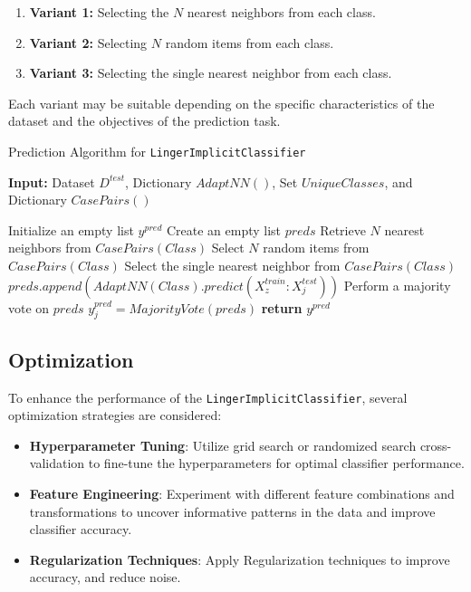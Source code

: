 \documentclass[a4paper, 12pt]{report}
\begin{document}
\begin{enumerate}
\item \textbf{Variant 1:} Selecting the $N$ nearest neighbors from each class.
\item \textbf{Variant 2:} Selecting $N$ random items from each class.
\item \textbf{Variant 3:} Selecting the single nearest neighbor from each class.
\end{enumerate}

Each variant may be suitable depending on the specific characteristics of the dataset and the objectives of the prediction task.
\begin{algorithm}[H]
    \caption{Prediction Algorithm for \texttt{LingerImplicitClassifier}}
    \label{alg:LingerImplicitClassifier_predict}
    \textbf{Input:} Dataset $D^{test}$, Dictionary $AdaptNN()$, Set $UniqueClasses$, and Dictionary $CasePairs()$
    \begin{algorithmic}
        \State Initialize an empty list $y^{pred}$
            \State Create an empty list $preds$
                    \State Retrieve $N$ nearest neighbors from $CasePairs(Class)$
                    \State Select $N$ random items from $CasePairs(Class)$
                    \State Select the single nearest neighbor from $CasePairs(Class)$
                \EndIf
                        \State $preds.append(AdaptNN(Class).predict(X^{train}_z:X^{test}_j))$
                    \EndFor
                \EndFor
                \State Perform a majority vote on $preds$
                \State $y^{pred}_j = MajorityVote(preds)$
            \EndFor
        \EndFor
        \State \textbf{return} $y^{pred}$
    \end{algorithmic}
\end{algorithm}

\subsection{Optimization}
To enhance the performance of the \texttt{LingerImplicitClassifier}, several optimization strategies are considered:
\begin{itemize}
    \item \textbf{Hyperparameter Tuning}: Utilize grid search or randomized search cross-validation to fine-tune the hyperparameters for optimal classifier performance.
    
    \item \textbf{Feature Engineering}: Experiment with different feature combinations and transformations to uncover informative patterns in the data and improve classifier accuracy.
    
    \item \textbf{Regularization Techniques}: Apply Regularization techniques to improve accuracy, and reduce noise.
\end{itemize}
\end{document}
